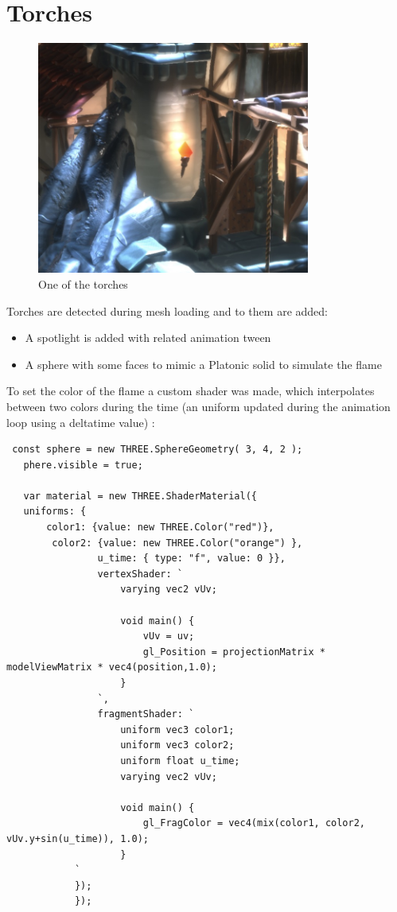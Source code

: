 \documentclass[10pt,a4paper]{article}
\begin{document}
\section{Torches}

\begin{figure}[H]
\caption{One of the torches}
\includegraphics[width=0.8\textwidth]{torch}
\end{figure}


Torches are detected during mesh loading and to them are added:

\begin{itemize}
 \item A spotlight is added with related animation tween
 \item A sphere with some faces to mimic a Platonic solid to simulate the flame
\end{itemize}

To set the color of the flame a custom shader was made, which interpolates between two colors during the time (an uniform updated during the animation loop using a deltatime value) :

\begin{verbatim}
 const sphere = new THREE.SphereGeometry( 3, 4, 2 );
   phere.visible = true;

   var material = new THREE.ShaderMaterial({
   uniforms: {
       color1: {value: new THREE.Color("red")},
        color2: {value: new THREE.Color("orange") },
                u_time: { type: "f", value: 0 }},
                vertexShader: `
                    varying vec2 vUv;

                    void main() {
                        vUv = uv;
                        gl_Position = projectionMatrix * modelViewMatrix * vec4(position,1.0);
                    }
                `,
                fragmentShader: `
                    uniform vec3 color1;
                    uniform vec3 color2;
                    uniform float u_time;
                    varying vec2 vUv;
                    
                    void main() {
                        gl_FragColor = vec4(mix(color1, color2, vUv.y+sin(u_time)), 1.0);
                    }
            `
            });
            });
\end{verbatim}
\end{document}
